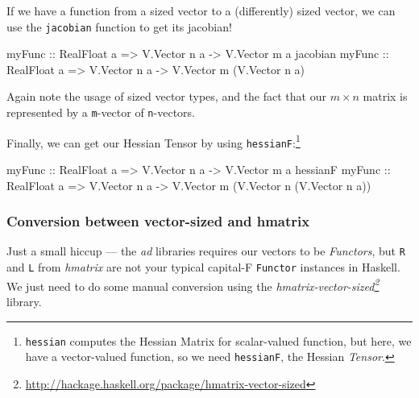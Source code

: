 \documentclass[]{article}
\newenvironment{Shaded}{}{}
\newcommand{\DataTypeTok}[1]{\textcolor[rgb]{0.56,0.13,0.00}{#1}}
\newcommand{\NormalTok}[1]{#1}
\newcommand{\OtherTok}[1]{\textcolor[rgb]{0.00,0.44,0.13}{#1}}
\renewcommand{\href}[2]{#2\footnote{\url{#1}}}
\begin{document}
If we have a function from a sized vector to a (differently) sized vector, we
can use the \texttt{jacobian} function to get its jacobian!

\begin{Shaded}
\begin{Highlighting}[]
\OtherTok{myFunc          ::} \DataTypeTok{RealFloat}\NormalTok{ a }\OtherTok{=\textgreater{}} \DataTypeTok{V.Vector}\NormalTok{ n a }\OtherTok{{-}\textgreater{}} \DataTypeTok{V.Vector}\NormalTok{ m a}
\NormalTok{jacobian}\OtherTok{ myFunc ::} \DataTypeTok{RealFloat}\NormalTok{ a }\OtherTok{=\textgreater{}} \DataTypeTok{V.Vector}\NormalTok{ n a }\OtherTok{{-}\textgreater{}} \DataTypeTok{V.Vector}\NormalTok{ m (}\DataTypeTok{V.Vector}\NormalTok{ n a)}
\end{Highlighting}
\end{Shaded}

Again note the usage of sized vector types, and the fact that our \(m \times n\)
matrix is represented by a \texttt{m}-vector of \texttt{n}-vectors.

Finally, we can get our Hessian Tensor by using \texttt{hessianF}:\footnote{\texttt{hessian}
  computes the Hessian Matrix for scalar-valued function, but here, we have a
  vector-valued function, so we need \texttt{hessianF}, the Hessian
  \emph{Tensor}.}

\begin{Shaded}
\begin{Highlighting}[]
\NormalTok{myFunc}
\OtherTok{    ::} \DataTypeTok{RealFloat}\NormalTok{ a }\OtherTok{=\textgreater{}} \DataTypeTok{V.Vector}\NormalTok{ n a }\OtherTok{{-}\textgreater{}} \DataTypeTok{V.Vector}\NormalTok{ m a}
\NormalTok{hessianF myFunc}
\OtherTok{    ::} \DataTypeTok{RealFloat}\NormalTok{ a }\OtherTok{=\textgreater{}} \DataTypeTok{V.Vector}\NormalTok{ n a }\OtherTok{{-}\textgreater{}} \DataTypeTok{V.Vector}\NormalTok{ m (}\DataTypeTok{V.Vector}\NormalTok{ n (}\DataTypeTok{V.Vector}\NormalTok{ n a))}
\end{Highlighting}
\end{Shaded}

\subsubsection{Conversion between vector-sized and
hmatrix}\label{conversion-between-vector-sized-and-hmatrix}

Just a small hiccup --- the \emph{ad} libraries requires our vectors to be
\emph{Functors}, but \texttt{R} and \texttt{L} from \emph{hmatrix} are not your
typical capital-F \texttt{Functor} instances in Haskell. We just need to do some
manual conversion using the
\emph{\href{http://hackage.haskell.org/package/hmatrix-vector-sized}{hmatrix-vector-sized}}
library.
\end{document}
